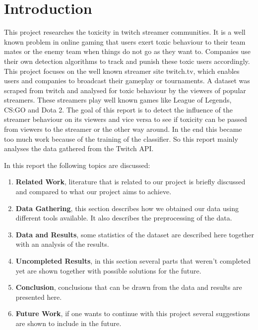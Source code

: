 \documentclass[final]{report}
\begin{document}
\chapter{Introduction}
\label{ch:introduction}

This project researches the toxicity in twitch streamer communities.
It is a well known problem in online gaming that users exert toxic behaviour to their team mates or the enemy team when things do not go as they want to.
Companies use their own detection algorithms to track and punish these toxic users accordingly.
This project focuses on the well known streamer site twitch.tv, which enables users and companies to broadcast their gameplay or tournaments.
A dataset was scraped from twitch and analysed for toxic behaviour by the viewers of popular streamers.
These streamers play well known games like League of Legends, CS:GO and Dota 2.
The goal of this report is to detect the influence of the streamer behaviour on its viewers and vice versa to see if toxicity can be passed from viewers to the streamer or the other way around. In the end this became too much work because of the training of the classifier. So this report mainly analyses the data gathered from the Twitch API.

In this report the following topics are discussed:
\begin{enumerate}
	\item \textbf{Related Work}, literature that is related to our project is briefly discussed and compared to what our project aims to achieve.
	\item \textbf{Data Gathering}, this section describes how we obtained our data using different tools available. It also describes the preprocessing of the data.
	\item \textbf{Data and Results}, some statistics of the dataset are described here together with an analysis  of the results.
	\item \textbf{Uncompleted Results}, in this section several parts that weren't completed yet are shown together with possible solutions for the future.
	\item \textbf{Conclusion}, conclusions that can be drawn from the data and results are presented here.
	\item \textbf{Future Work}, if one wants to continue with this project several suggestions are shown to include in the future.
\end{enumerate}
\end{document}
